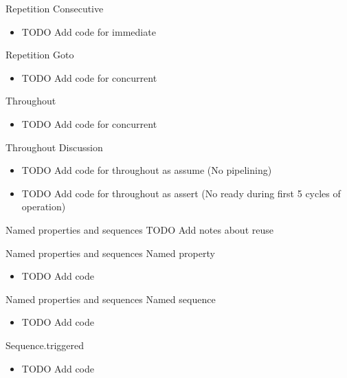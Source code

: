 \documentclass{beamer}
\begin{document}
\begin{frame}{Repetition}
Consecutive

\begin{itemize}
 \item TODO Add code for immediate
\end{itemize}
\end{frame}


\begin{frame}{Repetition}
Goto

\begin{itemize}
 \item TODO Add code for concurrent
\end{itemize}
\end{frame}


\begin{frame}{Throughout}
\begin{itemize}
 \item TODO Add code for concurrent
\end{itemize}
\end{frame}


\begin{frame}{Throughout}
Discussion
\begin{itemize}
 \item TODO Add code for throughout as assume (No pipelining)
 \item TODO Add code for throughout as assert (No ready during first 5 cycles of operation)
\end{itemize}
\end{frame}


\begin{frame}{Named properties and sequences}
TODO Add notes about reuse
\end{frame}


\begin{frame}{Named properties and sequences}
Named property
\begin{itemize}
 \item TODO Add code
\end{itemize}
\end{frame}


\begin{frame}{Named properties and sequences}
Named sequence
\begin{itemize}
 \item TODO Add code
\end{itemize}
\end{frame}


\begin{frame}{Sequence.triggered}
\begin{itemize}
 \item TODO Add code
\end{itemize}
\end{frame}
\end{document}
